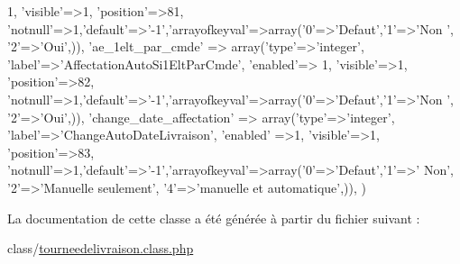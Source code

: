 \begin{DoxyCode}
      1, \textcolor{stringliteral}{'visible'}=>1, \textcolor{stringliteral}{'position'}=>81, \textcolor{stringliteral}{'notnull'}=>1,\textcolor{stringliteral}{'default'}=>\textcolor{stringliteral}{'-1'},\textcolor{stringliteral}{'arrayofkeyval'}=>array(\textcolor{charliteral}{'0'}=>\textcolor{stringliteral}{'Defaut'},\textcolor{charliteral}{'1'}=>\textcolor{stringliteral}{'Non
      '}, \textcolor{charliteral}{'2'}=>\textcolor{stringliteral}{'Oui'},)),
        \textcolor{stringliteral}{'ae\_1elt\_par\_cmde'} => array(\textcolor{stringliteral}{'type'}=>\textcolor{stringliteral}{'integer'}, \textcolor{stringliteral}{'label'}=>\textcolor{stringliteral}{'AffectationAutoSi1EltParCmde'}, \textcolor{stringliteral}{'enabled'}=>
      1, \textcolor{stringliteral}{'visible'}=>1, \textcolor{stringliteral}{'position'}=>82, \textcolor{stringliteral}{'notnull'}=>1,\textcolor{stringliteral}{'default'}=>\textcolor{stringliteral}{'-1'},\textcolor{stringliteral}{'arrayofkeyval'}=>array(\textcolor{charliteral}{'0'}=>\textcolor{stringliteral}{'Defaut'},\textcolor{charliteral}{'1'}=>\textcolor{stringliteral}{'Non
      '}, \textcolor{charliteral}{'2'}=>\textcolor{stringliteral}{'Oui'},)),
        \textcolor{stringliteral}{'change\_date\_affectation'} => array(\textcolor{stringliteral}{'type'}=>\textcolor{stringliteral}{'integer'}, \textcolor{stringliteral}{'label'}=>\textcolor{stringliteral}{'ChangeAutoDateLivraison'}, \textcolor{stringliteral}{'enabled'}
      =>1, \textcolor{stringliteral}{'visible'}=>1, \textcolor{stringliteral}{'position'}=>83, \textcolor{stringliteral}{'notnull'}=>1,\textcolor{stringliteral}{'default'}=>\textcolor{stringliteral}{'-1'},\textcolor{stringliteral}{'arrayofkeyval'}=>array(\textcolor{charliteral}{'0'}=>\textcolor{stringliteral}{'Defaut'},\textcolor{charliteral}{'1'}=>\textcolor{stringliteral}{'
      Non'}, \textcolor{charliteral}{'2'}=>\textcolor{stringliteral}{'Manuelle seulement'}, \textcolor{charliteral}{'4'}=>\textcolor{stringliteral}{'manuelle et automatique'},)),
    )
\end{DoxyCode}


La documentation de cette classe a été générée à partir du fichier suivant \+:\begin{DoxyCompactItemize}
\item 
class/\hyperlink{tourneedelivraison_8class_8php}{tourneedelivraison.\+class.\+php}\end{DoxyCompactItemize}

